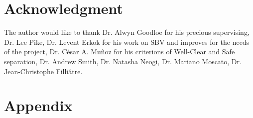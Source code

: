 \documentclass[a4paper,11pt,final]{article}
\begin{document}
	\section*{Acknowledgment}
	
	The author would like to thank Dr. Alwyn Goodloe for his precious supervising, Dr. Lee Pike, Dr. Levent Erkok for his work on SBV and improves for the needs of the project, Dr. César A. Muñoz for his criterions of Well-Clear and Safe separation, Dr. Andrew Smith, Dr. Natasha Neogi, Dr. Mariano Moscato, Dr. Jean-Christophe Filliâtre.
	
	
	\section*{Appendix}
	
\end{document}
